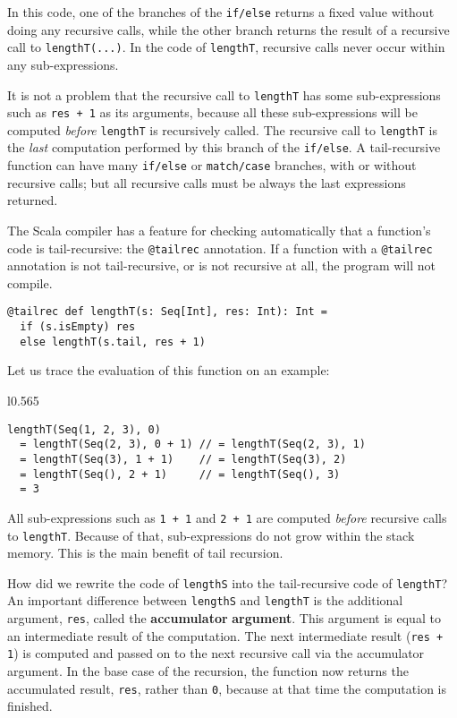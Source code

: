 \noindent In this code, one of the branches of the \lstinline!if/else!
returns a fixed value without doing any recursive calls, while the
other branch returns the result of a recursive call to \lstinline!lengthT(...)!.
In the code of \lstinline!lengthT!, recursive calls never occur within
any sub-expressions.

It is not a problem that the recursive call to \lstinline!lengthT!
has some sub-expressions such as \lstinline!res + 1! as its arguments,
because all these sub-expressions will be computed \emph{before} \lstinline!lengthT!
is recursively called. The recursive call to \lstinline!lengthT!
is the \emph{last} computation performed by this branch of the \lstinline!if/else!.
A tail-recursive function can have many \lstinline!if/else! or \lstinline!match/case!
branches, with or without recursive calls; but all recursive calls
must be always the last expressions returned.

The Scala compiler has a feature for checking automatically that a
function\textsf{'}s code is tail-recursive: the \lstinline!@tailrec! annotation.
If a function with a \lstinline!@tailrec! annotation is not tail-recursive,
or is not recursive at all, the program will not compile.
\begin{lstlisting}
@tailrec def lengthT(s: Seq[Int], res: Int): Int = 
  if (s.isEmpty) res
  else lengthT(s.tail, res + 1)
\end{lstlisting}
Let us trace the evaluation of this function on an example:

\begin{wrapfigure}{l}{0.565\columnwidth}%
\vspace{-0.8\baselineskip}
\begin{lstlisting}
lengthT(Seq(1, 2, 3), 0)
  = lengthT(Seq(2, 3), 0 + 1) // = lengthT(Seq(2, 3), 1)
  = lengthT(Seq(3), 1 + 1)    // = lengthT(Seq(3), 2)
  = lengthT(Seq(), 2 + 1)     // = lengthT(Seq(), 3)
  = 3
\end{lstlisting}

\vspace{-1.5\baselineskip}
\end{wrapfigure}%

\noindent All sub-expressions such as \lstinline!1 + 1! and \lstinline!2 + 1!
are computed \emph{before} recursive calls to \lstinline!lengthT!.
Because of that, sub-expressions do not grow within the stack memory.
This is the main benefit of tail recursion.

How did we rewrite the code of \lstinline!lengthS! into the tail-recursive
code of \lstinline!lengthT!? An important difference between \lstinline!lengthS!
and \lstinline!lengthT! is the additional argument, \lstinline!res!,
called the \textbf{accumulator}
\textbf{argument}. This argument is equal to an intermediate result
of the computation. The next intermediate result (\lstinline!res + 1!)
is computed and passed on to the next recursive call via the accumulator
argument. In the base case of the recursion, the function now returns
the accumulated result, \lstinline!res!, rather than \lstinline!0!,
because at that time the computation is finished.


